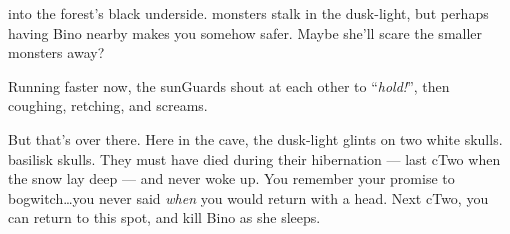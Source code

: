into the forest's black underside.
\Glspl{monster} stalk in the dusk-light, but perhaps having Bino nearby makes you somehow safer.
Maybe she'll scare the smaller \glspl{monster} away?

Running faster now, the \glspl{sunGuard} shout at each other to ``\textit{hold!}'', then coughing, retching, and screams.

But that's over there.
Here in the cave, the dusk-light glints on two white skulls.
\Gls{basilisk} skulls.
They must have died during their hibernation --- last \gls{cTwo} when the snow lay deep --- and never woke up.
You remember your promise to \gls{bogwitch}\ldots you never said \emph{when} you would return with a head.
Next \gls{cTwo}, you can return to this spot, and kill Bino as she sleeps.

\cyoaEnd
